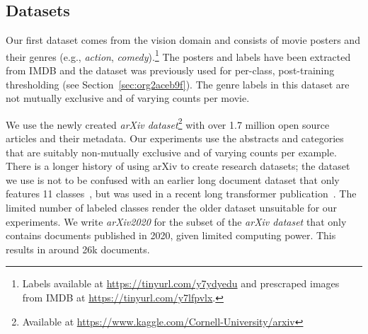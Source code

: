 \subsection{Datasets}

Our first dataset comes from the vision domain and consists of movie posters and their genres (e.g., \emph{action}, \emph{comedy}).\footnote{Labels available at \url{https://tinyurl.com/y7ydyedu} and prescraped images from IMDB at \url{https://tinyurl.com/y7lfpvlx}.} The posters and labels have been extracted from IMDB and the dataset was previously used for per-class, post-training thresholding \citep{moviePosters} (see Section~\ref{sec:org2aceb9f}). The genre labels in this dataset are not mutually exclusive and of varying counts per movie.

We use the newly created \emph{arXiv dataset}\footnote{Available at \url{https://www.kaggle.com/Cornell-University/arxiv}} with over 1.7 million open source articles and their metadata. Our experiments use the abstracts and categories that are suitably non-mutually exclusive and of varying counts per example. There is a longer history of using arXiv to create research datasets; the dataset we use is not to be confused with an earlier long document dataset that only features 11 classes~\citep{oldarXiv}, but was used in a recent long transformer publication~\cite{bigBird}. The limited number of labeled classes render the older dataset unsuitable for our experiments.  We write \textit{arXiv2020} for the subset of the \emph{arXiv dataset} that only contains documents published in 2020, given limited computing power. This results in around 26k documents.

